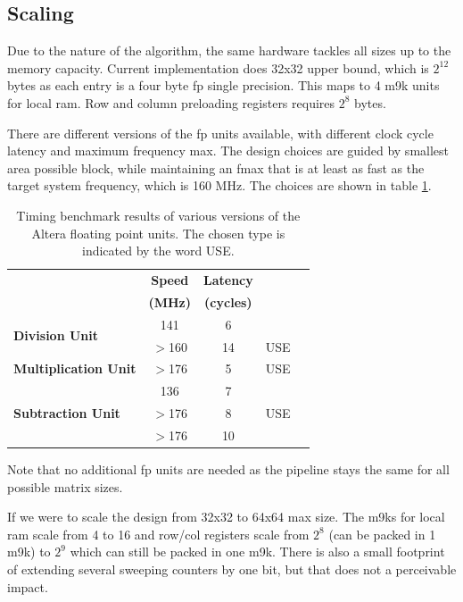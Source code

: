 \documentclass[]{article}
\begin{document}
\subsection{Scaling} %
\label{sub:scaling}

Due to the nature of the algorithm, the same hardware tackles all sizes up to the memory capacity. Current implementation does 32x32 upper bound, which is $2^12$ bytes as each entry is a four byte fp single precision. This maps to 4 m9k units for local ram. Row and column preloading registers requires $2^8$ bytes. 

There are different versions of the fp units available, with different clock cycle latency and maximum frequency max. The design choices are guided by smallest area possible block, while maintaining an fmax that is at least as fast as the target system frequency, which is 160 MHz. The choices are shown in table \ref{tab:fp_unit_bench}.


\begin{table}[tbp]
	\caption{Timing benchmark results of various versions of the Altera floating point units. The chosen type is indicated by the word USE.}
	\label{tab:fp_unit_bench}
	\begin{center}
		\begin{tabular}{l|cccc}
		\hline

		\hline
			& \textbf{Speed} 	& \textbf{Latency} 		& \\
			& \textbf{(MHz)}		& \textbf{(cycles)} & \\
		\hline
			\multirow{2}{*}{\textbf{Division Unit}}
			& 141		& 6 	&  \\
			& $>$160 	& 14 	& USE \\
		\hline
			\textbf{Multiplication Unit}
			& $>$176 	& 5 	& USE \\
		\hline
			\multirow{3}{*}{\textbf{Subtraction Unit}}
			& 136 		& 7 	& \\
			& $>$176 	& 8  	& USE \\
			& $>$176 	& 10 	& \\
		\hline

		\hline
		\end{tabular}
	\end{center}
\end{table}


Note that no additional fp units are needed as the pipeline stays the same for all possible matrix sizes.

If we were to scale the design from 32x32 to 64x64 max size. The m9ks for local ram scale from 4 to 16 and row/col registers scale from $2^8$ (can be packed in 1 m9k) to $2^9$ which can still be packed in one m9k. There is also a small footprint of extending several sweeping counters by one bit, but that does not a perceivable impact.
\end{document}
